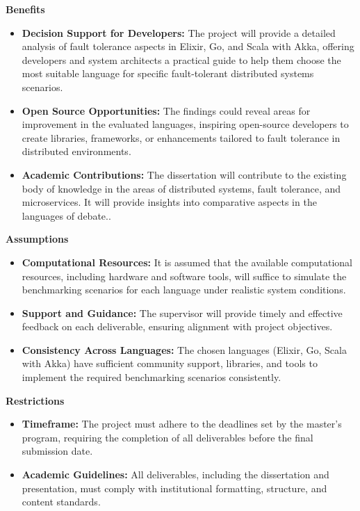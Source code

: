 \textbf{Benefits}

\begin{itemize}
    \item \textbf{Decision Support for Developers:}
          The project will provide a detailed analysis of fault tolerance aspects in Elixir, Go, and Scala with Akka, offering developers and system architects a practical guide to help them choose the most suitable language for specific fault-tolerant distributed systems scenarios.

    \item \textbf{Open Source Opportunities:}
          The findings could reveal areas for improvement in the evaluated languages, inspiring open-source developers to create libraries, frameworks, or enhancements tailored to fault tolerance in distributed environments.

    \item \textbf{Academic Contributions:}
          The dissertation will contribute to the existing body of knowledge in the areas of distributed systems, fault tolerance, and microservices. It will provide insights into comparative aspects in the languages of debate..

\end{itemize}

\noindent \textbf{Assumptions}

\begin{itemize}
    \item \textbf{Computational Resources:}
          It is assumed that the available computational resources, including hardware and software tools, will suffice to simulate the benchmarking scenarios for each language under realistic system conditions.

    \item \textbf{Support and Guidance:}
          The supervisor will provide timely and effective feedback on each deliverable, ensuring alignment with project objectives.

    \item \textbf{Consistency Across Languages:}
          The chosen languages (Elixir, Go, Scala with Akka) have sufficient community support, libraries, and tools to implement the required benchmarking scenarios consistently.
\end{itemize}

\noindent \textbf{Restrictions}

\begin{itemize}
    \item \textbf{Timeframe:}
          The project must adhere to the deadlines set by the master's program, requiring the completion of all deliverables before the final submission date.

    \item \textbf{Academic Guidelines:}
          All deliverables, including the dissertation and presentation, must comply with institutional formatting, structure, and content standards.

\end{itemize}


